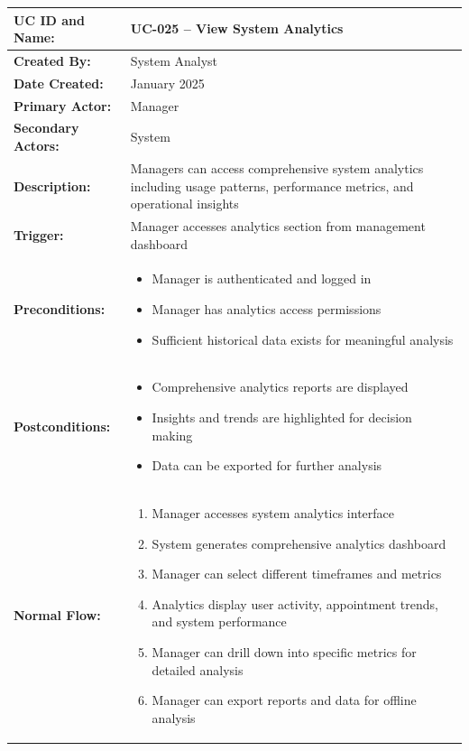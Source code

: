 \documentclass[12pt,a4paper]{article}
\begin{document}
\renewcommand{\arraystretch}{1.5}
\begin{longtable}{|p{4.5cm}|p{10.5cm}|}
\hline
\textbf{UC ID and Name:} & UC-025 – View System Analytics \\
\hline
\textbf{Created By:} & System Analyst \\
\hline
\textbf{Date Created:} & January 2025 \\
\hline
\textbf{Primary Actor:} & Manager \\
\hline
\textbf{Secondary Actors:} & System \\
\hline
\textbf{Description:} & Managers can access comprehensive system analytics including usage patterns, performance metrics, and operational insights \\
\hline
\textbf{Trigger:} & Manager accesses analytics section from management dashboard \\
\hline
\textbf{Preconditions:} &
\begin{itemize}
  \item Manager is authenticated and logged in
  \item Manager has analytics access permissions
  \item Sufficient historical data exists for meaningful analysis
\end{itemize} \\
\hline
\textbf{Postconditions:} &
\begin{itemize}
  \item Comprehensive analytics reports are displayed
  \item Insights and trends are highlighted for decision making
  \item Data can be exported for further analysis
\end{itemize} \\
\hline
\textbf{Normal Flow:} &
\begin{enumerate}
  \item Manager accesses system analytics interface
  \item System generates comprehensive analytics dashboard
  \item Manager can select different timeframes and metrics
  \item Analytics display user activity, appointment trends, and system performance
  \item Manager can drill down into specific metrics for detailed analysis
  \item Manager can export reports and data for offline analysis
\end{enumerate} \\

\end{longtable}
\end{document}
